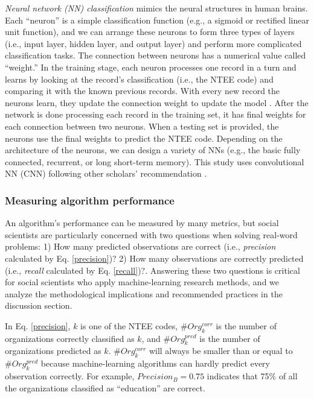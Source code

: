 \documentclass[11pt]{article}
\begin{document}
\textit{Neural network (NN) classification} mimics the neural structures in human brains. Each ``neuron'' is a simple classification function (e.g., a sigmoid or rectified linear unit function), and we can arrange these neurons to form three types of layers (i.e., input layer, hidden layer, and output layer) and perform more complicated classification tasks. The connection between neurons has a numerical value called ``weight.'' In the training stage, each neuron processes one record in a turn and learns by looking at the record's classification (i.e., the NTEE code) and comparing it with the known previous records. With every new record the neurons learn, they update the connection weight to update the model \parencites[163]{CollobertUnifiedArchitectureNatural2008}. After the network is done processing each record in the training set, it has final weights for each connection between two neurons. When a testing set is provided, the neurons use the final weights to predict the NTEE code. Depending on the architecture of the neurons, we can design a variety of NNs (e.g., the basic fully connected, recurrent, or long short-term memory). This study uses convolutional NN (CNN) following other scholars' recommendation \parencite{ZhangSensitivityAnalysisPractitioners2015}.

\subsubsection{Measuring algorithm performance}

An algorithm's performance can be measured by many metrics, but social scientists are particularly concerned with two questions when solving real-word problems: 1) How many predicted observations are correct (i.e., \textit{precision} calculated by Eq. \ref{precision})? 2) How many observations are correctly predicted (i.e., \textit{recall} calculated by Eq. \ref{recall})?. Answering these two questions is critical for social scientists who apply machine-learning research methods, and we analyze the methodological implications and recommended practices in the discussion section.

In Eq. \ref{precision}, $k$ is one of the NTEE codes, $\#Org^{corr}_{k}$ is the number of organizations correctly classified as $k$, and ${\#Org^{pred}_{k}}$ is the number of organizations predicted as $k$. $\#Org^{corr}_{k}$ will always be smaller than or equal to ${\#Org^{pred}_{k}}$ because machine-learning algorithms can hardly predict every observation correctly. For example, $Precision_{B}=0.75$ indicates that 75\% of all the organizations classified as ``education'' are correct.
\end{document}
